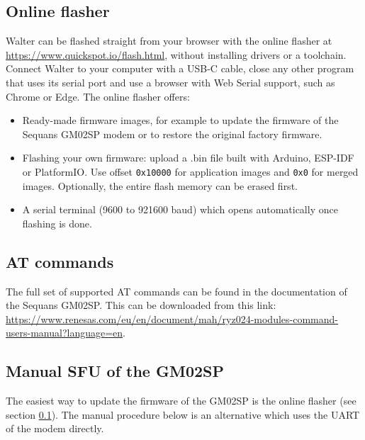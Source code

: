 \documentclass[11pt]{article}
\begin{document}
\subsection{Online flasher} \label{online_flasher}
Walter can be flashed straight from your browser with the online flasher at \url{https://www.quickspot.io/flash.html}, without installing drivers or a toolchain. Connect Walter to your computer with a USB-C cable, close any other program that uses its serial port and use a browser with Web Serial support, such as Chrome or Edge. The online flasher offers:
\begin{itemize}
	\item Ready-made firmware images, for example to update the firmware of the Sequans GM02SP modem or to restore the original factory firmware.
	\item Flashing your own firmware: upload a .bin file built with Arduino, ESP-IDF or PlatformIO. Use offset \verb+0x10000+ for application images and \verb+0x0+ for merged images. Optionally, the entire flash memory can be erased first.
	\item A serial terminal (9600 to 921600 baud) which opens automatically once flashing is done.
\end{itemize}

\subsection{AT commands}

The full set of supported AT commands can be found in the documentation of the Sequans GM02SP. This can be downloaded from this link: \href{https://www.renesas.com/eu/en/document/mah/ryz024-modules-command-users-manual?language=en}{https://www.renesas.com/eu/en/document/mah/ryz024-modules-command-users-manual?language=en}.

\subsection{Manual SFU of the GM02SP}

The easiest way to update the firmware of the GM02SP is the online flasher (see section \ref{online_flasher}). The manual procedure below is an alternative which uses the UART of the modem directly.\\
\end{document}
